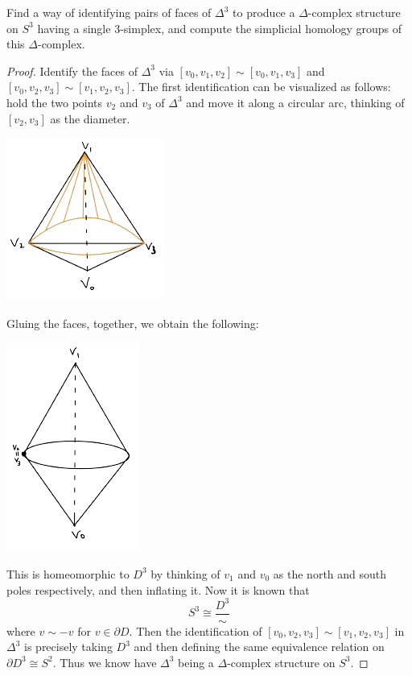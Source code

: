 \documentclass[a4paper]{article}
\begin{document}
\begin{ex}{}{} Find a way of identifying pairs of faces of $\Delta^3$ to produce a $\Delta$-complex structure on $S^3$ having a single $3$-simplex, and compute the simplicial homology groups of this $\Delta$-complex. \tcbline
\begin{proof}
Identify the faces of $\Delta^3$ via $[v_0,v_1,v_2]\sim[v_0,v_1,v_3]$ and $[v_0,v_2,v_3]\sim[v_1,v_2,v_3]$. The first identification can be visualized as follows: hold the two points $v_2$ and $v_3$ of $\Delta^3$ and move it along a circular arc, thinking of $[v_2,v_3]$ as the diameter. 

\begin{center}
\includegraphics[scale = 0.8]{Image 6}
\end{center}

Gluing the faces, together, we obtain the following: 

\begin{center}
\includegraphics[scale = 0.8]{Image 7}
\end{center}

This is homeomorphic to $D^3$ by thinking of $v_1$ and $v_0$ as the north and south poles respectively, and then inflating it. Now it is known that $$S^3\cong\frac{D^3}{\sim}$$ where $v\sim -v$ for $v\in\partial D$. Then the identification of $[v_0,v_2,v_3]\sim[v_1,v_2,v_3]$ in $\Delta^3$ is precisely taking $D^3$ and then defining the same equivalence relation on $\partial D^3\cong S^2$. Thus we know have $\Delta^3$ being a $\Delta$-complex structure on $S^3$. 


\end{proof}
\end{ex}
\end{document}
